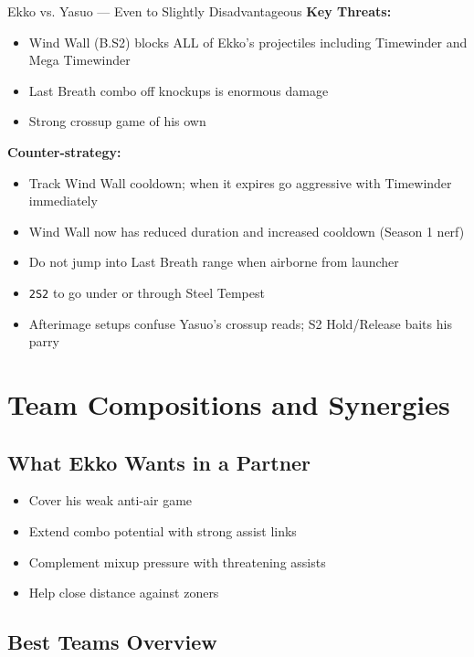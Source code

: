 \documentclass[12pt, a4paper]{report}
\newcommand{\notation}[1]{{\small\texttt{\textcolor{ekkoBlue}{#1}}}}
\begin{document}
\begin{matchupbox}[]{Ekko vs. Yasuo --- Even to Slightly Disadvantageous}
\textbf{Key Threats:}
\begin{itemize}
  \item Wind Wall (B.S2) blocks ALL of Ekko's projectiles including Timewinder and Mega Timewinder
  \item Last Breath combo off knockups is enormous damage
  \item Strong crossup game of his own
\end{itemize}
\textbf{Counter-strategy:}
\begin{itemize}
  \item Track Wind Wall cooldown; when it expires go aggressive with Timewinder immediately
  \item Wind Wall now has reduced duration and increased cooldown (Season 1 nerf)
  \item Do not jump into Last Breath range when airborne from launcher
  \item \notation{2S2} to go under or through Steel Tempest
  \item Afterimage setups confuse Yasuo's crossup reads; S2 Hold/Release baits his parry
\end{itemize}
\end{matchupbox}

\chapter{Team Compositions and Synergies}

\section{What Ekko Wants in a Partner}

\begin{itemize}
  \item Cover his weak anti-air game
  \item Extend combo potential with strong assist links
  \item Complement mixup pressure with threatening assists
  \item Help close distance against zoners
\end{itemize}

\section{Best Teams Overview}
\end{document}
